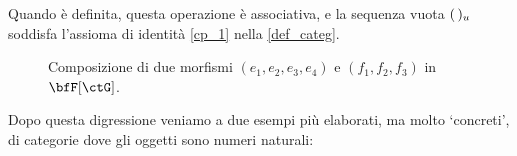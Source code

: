 \begin{example}
	Quando è definita, questa operazione è associativa, e la sequenza vuota \((\,)_u\) soddisfa l'assioma di identità \ref{cp_1} nella \ref{def_categ}.
	\begin{figure}
		\begin{center}
		\end{center}
		\caption{Composizione di due morfismi \((e_1,e_2,e_3,e_4)\) e \((f_1,f_2,f_3)\) in \(\bfF[\ctG]\).}
		\label{fig:enter-label}
	\end{figure}
\end{example}
Dopo questa digressione veniamo a due esempi più elaborati, ma molto `concreti', di categorie dove gli oggetti sono numeri naturali:
